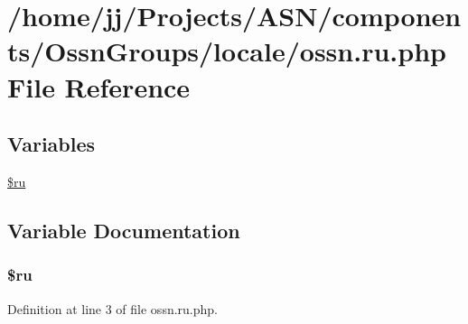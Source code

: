 \hypertarget{components_2_ossn_groups_2locale_2ossn_8ru_8php}{}\section{/home/jj/\+Projects/\+A\+S\+N/components/\+Ossn\+Groups/locale/ossn.ru.\+php File Reference}
\label{components_2_ossn_groups_2locale_2ossn_8ru_8php}
\subsection*{Variables}
\begin{DoxyCompactItemize}
\item 
\hyperlink{components_2_ossn_groups_2locale_2ossn_8ru_8php_aab84a3feda2b0e489cac7cd194e8d726}{\$ru}
\end{DoxyCompactItemize}


\subsection{Variable Documentation}
\subsubsection[{\texorpdfstring{\$ru}{$ru}}]{\setlength{\rightskip}{0pt plus 5cm}\$ru}\hypertarget{components_2_ossn_groups_2locale_2ossn_8ru_8php_aab84a3feda2b0e489cac7cd194e8d726}{}\label{components_2_ossn_groups_2locale_2ossn_8ru_8php_aab84a3feda2b0e489cac7cd194e8d726}


Definition at line 3 of file ossn.\+ru.\+php.

